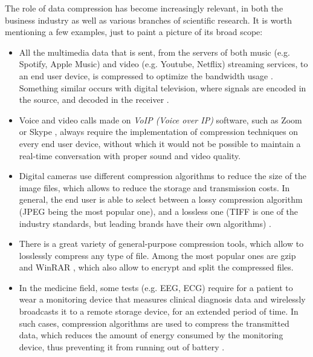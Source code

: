 The role of data compression has become increasingly relevant, in both the business industry as well as various branches of scientific research. It is worth mentioning a few examples, just to paint a picture of its broad scope:
\vspace{-5pt}
\begin{itemize}
\item All the multimedia data that is sent, from the servers of both music (e.g. Spotify, Apple Music) and video (e.g. Youtube, Netflix) streaming services, to an end user device, is compressed to optimize the bandwidth usage \cite{SpotifyApple, HEVC}. Something similar occurs with digital television, where signals are encoded in the source, and decoded in the receiver \cite{DTV}.

\item Voice and video calls made on \textit{VoIP (Voice over IP)} software, such as Zoom \cite{Zoom} or Skype \cite{Skype}, always require the implementation of compression techniques on every end user device, without which it would not be possible to maintain a real-time conversation with proper sound and video quality.

\item Digital cameras use different compression algorithms to reduce the size of the image files, which allows to reduce the storage and transmission costs. In general, the end user is able to select between a lossy compression algorithm (JPEG being the most popular one), and a lossless one (TIFF is one of the industry standards, but leading brands have their own algorithms) \cite{Nikon, Canon}. 

\item There is a great variety of general-purpose compression tools, which allow to losslessly compress any type of file. Among the most popular ones are gzip \cite{gzip} and WinRAR \cite{WinRAR}, which also allow to encrypt and split the compressed files. 

\item In the medicine field, some tests (e.g. EEG, ECG) require for a patient to wear a monitoring device that measures clinical diagnosis data and wirelessly broadcasts it to a remote storage device, for an extended period of time. In such cases, compression algorithms are used to compress the transmitted data, which reduces the amount of energy consumed by the monitoring device,
thus preventing it from running out of battery \cite{EEG, ECG}.


\end{itemize}
